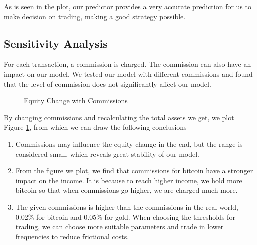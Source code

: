 \documentclass[12pt,a4paper]{article}
\begin{document}
\begin{spacing}{1.2}
As is seen in the plot, our predictor provides a very accurate prediction for us to make decision on trading, making a good strategy possible. 

\subsection{Sensitivity Analysis}

For each transaction, a commission is charged. The commission can also have an impact on our model. We tested our model with different commissions and found that the level of commission does not significantly affect our model.

 \begin{figure}[H]
	\caption{Equity Change with Commissions}
	\label{figure:sensitive_test}
\end{figure}

By changing commissions and recalculating the total assets we get, we plot Figure \ref{figure:sensitive_test}, from which we can draw the following conclusions

\begin{enumerate}
	\item Commissions may influence the equity change in the end, but the range is considered small, which reveals great stability of our model.
	
	\item From the figure we plot, we find that commissions for bitcoin have a stronger impact on the income. It is because to reach higher income, we hold more bitcoin so that when commissions go higher, we are charged much more.
	
	\item The given commissions is higher than the commissions in the real world, 0.02\% for bitcoin and 0.05\% for gold. When choosing the thresholds for trading, we can choose more suitable parameters and trade in lower frequencies to reduce frictional costs.
\end{enumerate}


\end{spacing}
\end{document}
